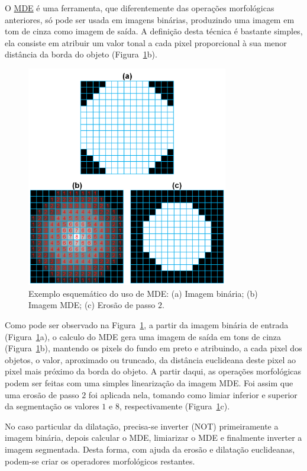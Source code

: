 O \underline{MDE} é uma ferramenta, que diferentemente das operações
morfológicas anteriores, só pode ser usada em imagens binárias,
produzindo uma imagem em tom de cinza como imagem de saída.\cite{113}
A definição desta técnica é bastante simples, ela consiste em atribuir
um valor tonal a cada pixel proporcional à sua menor distância da
borda do objeto (Figura~\ref{fig:euclide-erode}b).

\begin{figure} [h]
  \begin{center}
    \includegraphics[height=274pt,width=250pt]{images/fig_euclide-erode}
    \caption{Exemplo esquemático do uso de MDE: (a) Imagem binária;
      (b) Imagem MDE; (c) Erosão de passo
      $2$.}\label{fig:euclide-erode}
  \end{center}
\end{figure}

Como pode ser observado na Figura~\ref{fig:euclide-erode}, a partir da
imagem binária de entrada (Figura~\ref{fig:euclide-erode}a), o calculo
do MDE gera uma imagem de saída em tons de cinza
(Figura~\ref{fig:euclide-erode}b), mantendo os pixels do fundo em
preto e atribuindo, a cada pixel dos objetos, o valor, aproximado ou
truncado, da distância euclideana deste pixel ao pixel mais próximo da
borda do objeto. A partir daqui, as operações morfológicas podem ser
feitas com uma simples linearização da imagem MDE. Foi assim que uma
erosão de passo $2$ foi aplicada nela, tomando como limiar inferior e
superior da segmentação os valores $1$ e $8$, respectivamente
(Figura~\ref{fig:euclide-erode}c).

No caso particular da dilatação, precisa-se inverter (NOT)
primeiramente a imagem binária, depois calcular o MDE, limiarizar o
MDE e finalmente inverter a imagem segmentada. Desta forma, com ajuda
da erosão e dilatação euclideanas, podem-se criar os operadores
morfológicos restantes.

